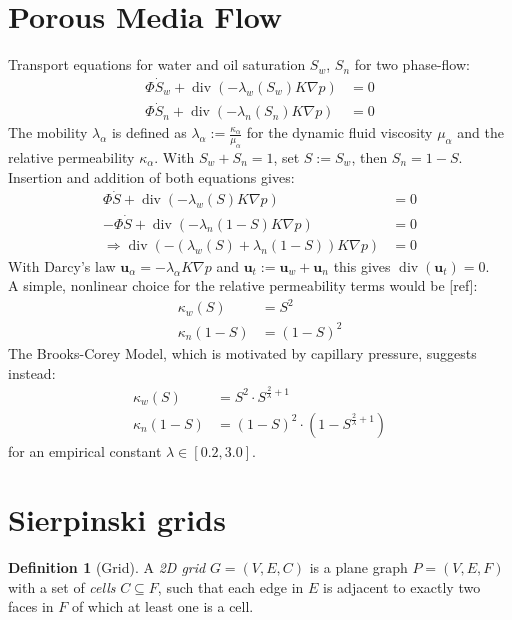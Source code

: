 \documentclass{IOS-Book-Article}
\theoremstyle{plain}
\theoremstyle{definition}
\newtheorem{definition}{Definition}[section]
\DeclareMathOperator{\diverg}{div}
\begin{document}
\newpage
\section{Porous Media Flow}

Transport equations for water and oil saturation $S_w$, $S_n$ for two phase-flow:
\begin{align}
	\Phi \dot S_w + \diverg (- \lambda_w (S_w) K \nabla p) &= 0 \\
	\Phi \dot S_n + \diverg (- \lambda_n (S_n) K \nabla p) &= 0
\end{align}
The mobility $\lambda_\alpha$ is defined as $\lambda_\alpha := \frac{\kappa_\alpha}{\mu_\alpha}$ for the dynamic fluid viscosity $\mu_\alpha$ and the relative permeability $\kappa_\alpha$.
With $S_w + S_n = 1$, set $S := S_w$, then $S_n = 1 - S$.
Insertion and addition of both equations gives:
\begin{align}
	\Phi \dot S + \diverg (- \lambda_w (S) K \nabla p) &= 0 \\
	- \Phi \dot{S} + \diverg (- \lambda_n (1 - S) K \nabla p) &= 0 \\
	\Rightarrow \diverg (- (\lambda_w (S) + \lambda_n (1 - S)) K \nabla p) &= 0
\end{align}
With Darcy's law $\mathbf u_\alpha = - \lambda_\alpha K \nabla p$ and $\mathbf u_t := \mathbf u_w + \mathbf u_n$ this gives $\diverg (\mathbf u_t) = 0$.\\
A simple, nonlinear choice for the relative permeability terms would be [ref]:
\begin{align}
	\kappa_w(S) &= S^2 \\
	\kappa_n(1 - S) &= (1 - S)^2
\end{align}
The Brooks-Corey Model, which is motivated by capillary pressure, suggests instead:
\begin{align}
	\kappa_w(S) &= S^2 \cdot S^{\frac{2}{\lambda} + 1} \\
	\kappa_n(1 - S) &= (1 - S)^2 \cdot (1 - S^{\frac{2}{\lambda} + 1}) 
\end{align}
for an empirical constant $\lambda \in [ 0.2, 3.0 ]$.

\newpage
\section{Sierpinski grids}

\begin{definition} [Grid]
	A \emph{2D grid} $G = (V, E, C)$ is a plane graph $P = (V, E, F)$ with a set of \emph{cells} $C \subseteq F$, such that each edge in $E$ is adjacent to exactly two faces in $F$ of which at least one is a cell.
\end{definition}
\end{document}
